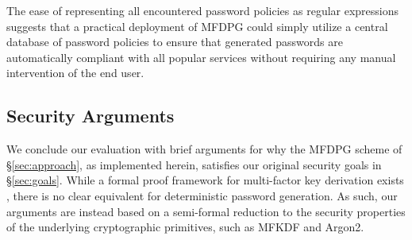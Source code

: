 The ease of representing all encountered password policies as regular expressions suggests that a practical deployment of MFDPG could simply utilize a central database of password policies to ensure that generated passwords are automatically compliant with all popular services without requiring any manual intervention of the end user.

\eject

\subsection{Security Arguments}

We conclude our evaluation with brief arguments for why the MFDPG scheme of \S\ref{sec:approach}, as implemented herein, satisfies our original security goals in \S\ref{sec:goals}.
While a formal proof framework for multi-factor key derivation exists \cite{krawczyk, mfkdf}, there is no clear equivalent for deterministic password generation. As such, our arguments are instead based on a semi-formal reduction to the security properties of the underlying cryptographic primitives, such as MFKDF and Argon2.



